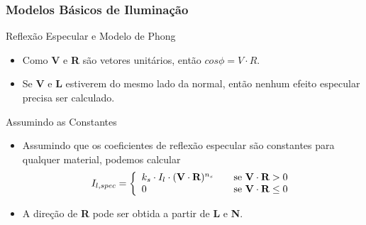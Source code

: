 \documentclass{beamer}
\begin{document}
\begin{frame}
\frametitle{Modelos Básicos de Iluminação}

	\begin{block}{Reflexão Especular e Modelo de Phong}
		\begin{itemize}
			\item Como \textbf{V} e \textbf{R} são vetores unitários, então $cos \phi = V \cdot R$.
			\item Se \textbf{V} e \textbf{L} estiverem do mesmo lado da normal, então nenhum efeito especular precisa ser calculado.
		\end{itemize}
	\end{block}
	
	\begin{block}{Assumindo as Constantes}
		\begin{itemize}
			\item Assumindo que os coeficientes de reflexão especular são constantes para qualquer material, podemos calcular
			\begin{equation*}
					I_{l,spec} = \left\{
					\begin{array}{l l}
   						 k_s \cdot I_l \cdot (\textbf{V} \cdot \textbf{R})^{n_s} & \quad \text{se } \textbf{V} \cdot \textbf{R} > 0\\
    						0 & \quad \text{se } \textbf{V} \cdot \textbf{R} \leq 0 
  					\end{array} \right.
				\end{equation*}
			\item A direção de \textbf{R} pode ser obtida a partir de \textbf{L} e \textbf{N}.
		\end{itemize}
	\end{block}
\end{frame}
\end{document}
